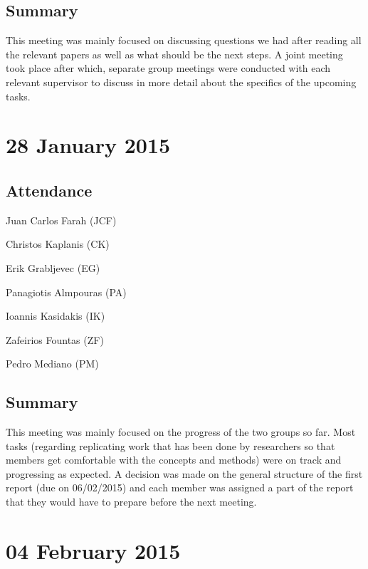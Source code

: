 \documentclass[a4paper,11pt]{article}
\begin{document}
\subsection*{Summary}
This meeting was mainly focused on discussing questions we had after reading all the relevant papers as well as what should be the next steps. A joint meeting took place after which, separate group meetings were conducted with each relevant supervisor to discuss in more detail about the specifics of the upcoming tasks.

\maketitle
\section*{28 January 2015}
\subsection*{Attendance}
\begin{compactenum}
\item Juan Carlos Farah (JCF)
\item Christos Kaplanis (CK)
\item Erik Grabljevec (EG)
\item Panagiotis Almpouras (PA)
\item Ioannis Kasidakis (IK)
\item Zafeirios Fountas (ZF)
\item Pedro Mediano (PM)
\end{compactenum}

\subsection*{Summary}
This meeting was mainly focused on the progress of the two groups so far. Most tasks (regarding replicating work that has been done by researchers so that members get comfortable with the concepts and methods) were on track and progressing as expected. A decision was made on the general structure of the first report (due on 06/02/2015) and each member was assigned a part of the report that they would have to prepare before the next meeting.

\maketitle
\section*{04 February 2015}
\end{document}
